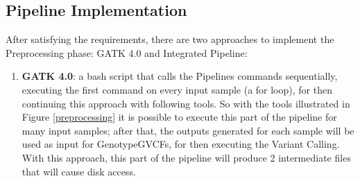 \subsection{Pipeline Implementation}
After satisfying the requirements, there are two approaches to implement the Preprocessing phase: GATK 4.0 and Integrated Pipeline:
\begin{enumerate}
  \item \textbf{GATK 4.0}: a bash script that calls the Pipelines commands sequentially, executing the first command on every input sample (a for loop), for then continuing this approach with following tools.
So with the tools illustrated in Figure \ref{preprocessing} it is possible to execute this part of the pipeline for many input samples; after that, the outputs generated for each sample will be used as input for GenotypeGVCFs, for then executing the Variant Calling.\newline
With this approach, this part of the pipeline will produce 2 intermediate files that will cause disk access.


\end{enumerate}
